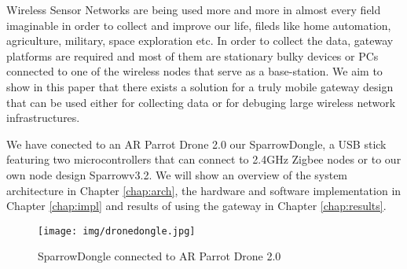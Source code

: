 Wireless Sensor Networks are being used more and more in almost every field imaginable in order to collect and improve our life, fileds like home automation, agriculture, military, space exploration etc. In order to collect the data, gateway platforms \cite{hill2004platforms,da2011design,da2011design2} are required and most of them are stationary bulky devices or PCs connected to one of the wireless nodes that serve as a base-station. We aim to show in this paper that there exists a solution for a truly mobile gateway design that can be used either for collecting data or for debuging large wireless network infrastructures.

We have conected to an AR Parrot Drone 2.0 our SparrowDongle, a USB stick featuring two microcontrollers that can connect to 2.4GHz Zigbee nodes or to our own node design Sparrowv3.2. We will show an overview of the system
architecture in Chapter \ref{chap:arch}, the hardware and software
implementation in Chapter \ref{chap:impl} and results of using the gateway in
Chapter \ref{chap:results}. 

\begin{figure}[ht] \centering
\texttt{[image: img/dronedongle.jpg]} \caption{SparrowDongle connected to AR Parrot Drone 2.0 } \end{figure}


